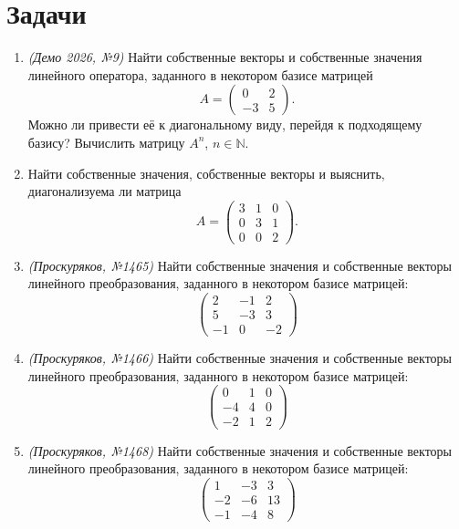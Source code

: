 \section*{Задачи}

\begin{enumerate}
    \item \textit{(Демо 2026, №9)} 
    Найти собственные векторы и собственные значения линейного оператора, заданного в некотором базисе матрицей
    \[
    A=\begin{pmatrix}
    0 & 2 \\
    -3 & 5
    \end{pmatrix}.
    \]
    Можно ли привести её к диагональному виду, перейдя к подходящему базису? Вычислить матрицу $A^n$, $n\in\mathbb{N}$.

    \item 
    Найти собственные значения, собственные векторы и выяснить, диагонализуема ли матрица
    \[
    A=\begin{pmatrix}
    3 & 1 & 0 \\
    0 & 3 & 1 \\
    0 & 0 & 2
    \end{pmatrix}.
    \]

    \item \textit{(Проскуряков, №1465)} Найти собственные значения и собственные векторы линейного преобразования, заданного в некотором базисе матрицей:
    \[
    \begin{pmatrix}
     2 & -1 &  2 \\
     5 & -3 &  3 \\
    -1 &  0 & -2
    \end{pmatrix}
    \]

    \item \textit{(Проскуряков, №1466)} Найти собственные значения и собственные векторы линейного преобразования, заданного в некотором базисе матрицей:
    \[
    \begin{pmatrix}
     0 & 1 & 0 \\
    -4 & 4 & 0 \\
    -2 & 1 & 2
    \end{pmatrix}
    \]


    \item \textit{(Проскуряков, №1468)} Найти собственные значения и собственные векторы линейного преобразования, заданного в некотором базисе матрицей:
    \[
    \begin{pmatrix}
     1 & -3 &  3 \\
    -2 & -6 & 13 \\
    -1 & -4 &  8
    \end{pmatrix}
    \]


\end{enumerate}
